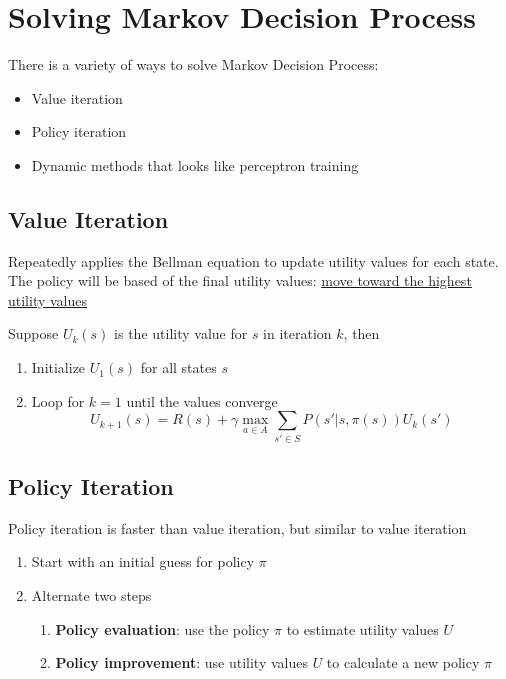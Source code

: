 \section{Solving Markov Decision Process}

  There is a variety of ways to solve Markov Decision Process:

  \begin{itemize}
    \item Value iteration
    \item Policy iteration
    \item Dynamic methods that looks like perceptron training
  \end{itemize}

  \subsection{Value Iteration}

    Repeatedly applies the Bellman equation to update utility values for
    each state. The policy will be based of the final utility values:
    \ul{move toward the highest utility values}

    Suppose $ U_{k}\left( s \right) $ is the utility value
    for $ s $ in iteration $ k $, then

    \begin{enumerate}
      \item Initialize $ U_{1}\left( s \right) $ for all states $ s $
      \item Loop for $ k = 1 $ until the values converge
      \begin{equation}
        U_{k + 1}\left( s \right)
          = R\left( s \right)
          + \gamma \max_{a \in A} \sum_{s' \in S}
          P\left( s' | s, \pi\left( s \right) \right)
          U_{k}\left( s' \right)
      \end{equation}
    \end{enumerate}

  \subsection{Policy Iteration}

    Policy iteration is faster than value iteration, but similar to value
    iteration

    \begin{enumerate}
      \item Start with an initial guess for policy $ \pi $
      \item Alternate two steps
      \begin{enumerate}
        \item \textbf{Policy evaluation}: use the policy $ \pi $ to estimate
        utility values $ U $
        \item \textbf{Policy improvement}: use utility values $ U $ to
        calculate a new policy $ \pi $
      \end{enumerate}
    \end{enumerate}

